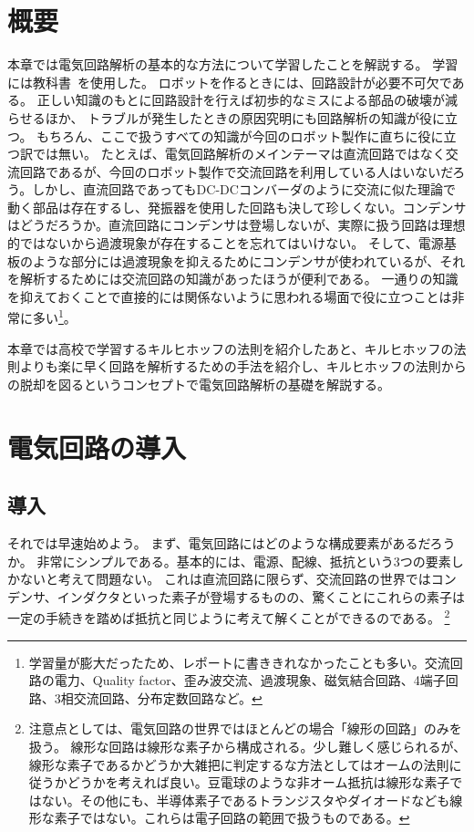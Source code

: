 \documentclass{ltjsreport}
\begin{document}
\section{概要}
本章では電気回路解析の基本的な方法について学習したことを解説する。
学習には教科書~\cite{ElectricCircuit}を使用した。
ロボットを作るときには、回路設計が必要不可欠である。
正しい知識のもとに回路設計を行えば初歩的なミスによる部品の破壊が減らせるほか、
トラブルが発生したときの原因究明にも回路解析の知識が役に立つ。
もちろん、ここで扱うすべての知識が今回のロボット製作に直ちに役に立つ訳では無い。
たとえば、電気回路解析のメインテーマは直流回路ではなく交流回路であるが、今回のロボット製作で交流回路を利用している人はいないだろう。しかし、直流回路であってもDC-DCコンバーダのように交流に似た理論で動く部品は存在するし、発振器を使用した回路も決して珍しくない。コンデンサはどうだろうか。直流回路にコンデンサは登場しないが、実際に扱う回路は理想的ではないから過渡現象が存在することを忘れてはいけない。
そして、電源基板のような部分には過渡現象を抑えるためにコンデンサが使われているが、それを解析するためには交流回路の知識があったほうが便利である。
一通りの知識を抑えておくことで直接的には関係ないように思われる場面で役に立つことは非常に多い\footnote{学習量が膨大だったため、レポートに書ききれなかったことも多い。交流回路の電力、Quality factor、歪み波交流、過渡現象、磁気結合回路、4端子回路、3相交流回路、分布定数回路など。}。

本章では高校で学習するキルヒホッフの法則を紹介したあと、キルヒホッフの法則よりも楽に早く回路を解析するための手法を紹介し、キルヒホッフの法則からの脱却を図るというコンセプトで電気回路解析の基礎を解説する。



\section{電気回路の導入}
\subsection{導入}
それでは早速始めよう。
まず、電気回路にはどのような構成要素があるだろうか。
非常にシンプルである。基本的には、電源、配線、抵抗という3つの要素しかないと考えて問題ない。
これは直流回路に限らず、交流回路の世界ではコンデンサ、インダクタといった素子が登場するものの、驚くことにこれらの素子は一定の手続きを踏めば抵抗と同じように考えて解くことができるのである。
\footnote{注意点としては、電気回路の世界ではほとんどの場合「線形の回路」のみを扱う。
線形な回路は線形な素子から構成される。少し難しく感じられるが、線形な素子であるかどうか大雑把に判定するな方法としてはオームの法則に従うかどうかを考えれば良い。豆電球のような非オーム抵抗は線形な素子ではない。その他にも、半導体素子であるトランジスタやダイオードなども線形な素子ではない。これらは電子回路の範囲で扱うものである。}
\end{document}
